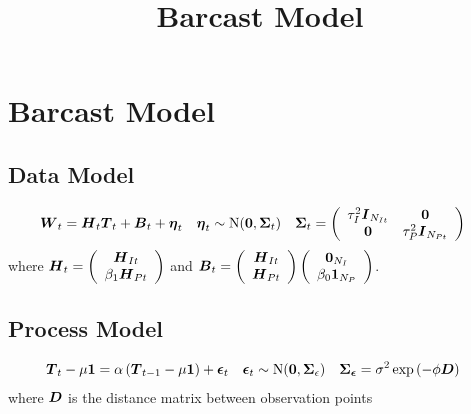 \documentclass{article}\usepackage[]{graphicx}\usepackage[]{color}
\title{Barcast Model}
\def\bm#1{\mbox{\boldmath $#1$}}
\begin{document}
\maketitle
%
%
\section{Barcast Model}
%
%
\subsection{Data Model}
%
\begin{align*}
%
\bm{W}_t & = \bm{H}_t \bm{T}_t + \bm{B}_t + \bm{\eta}_t & \bm{\eta}_t & \sim \mbox{N}(\bm{0}, \bm{\Sigma}_t) & \bm{\Sigma}_t & = \left( \begin{array}{cc} \tau_I^2 \bm{I}_{N_{It}} & \bm{0}\\ \bm{0} & \tau_P^2 \bm{I}_{N_{Pt}} \end{array} \right)
%
\end{align*}
%
where $\bm{H}_t = \left( \begin{array}{c} \bm{H}_{It}\\ \beta_1 \bm{H}_{Pt} \end{array} \right)$ and $\bm{B}_t = \left( \begin{array}{c} \bm{H}_{It}\\ \bm{H}_{Pt} \end{array} \right) \left( \begin{array}{c} \bm{0}_{N_I}\\ \beta_0 \bm{1}_{N_P} \end{array} \right)$.
%
%
\subsection{Process Model}
%
\begin{align*}
\bm{T}_t - \mu \bm{1} & = \alpha \left( \bm{T}_{t - 1} - \mu \bm{1} \right) + \bm{\epsilon}_t  & \bm{\epsilon}_t & \sim \mbox{N}(\bm{0}, \bm{\Sigma}_\epsilon) & \bm{\Sigma_\epsilon} & = \sigma^2 \exp{\left( - \phi \bm{D} \right)}
\end{align*}
%
where $\bm{D}$ is the distance matrix between observation points
%
%
\end{document}
